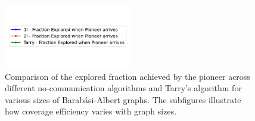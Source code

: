 \begin{figure}[H]
    \centering
    \qquad
    \qquad
    \includegraphics[width=0.5\textwidth]{Cap3/no_comm_fraction_legend.pdf}
    \newline
    \qquad
    \newline
    \qquad
    \caption{Comparison of the explored fraction achieved by the pioneer across different no-communication algorithms and Tarry's algorithm for various sizes of Barabási-Albert graphs. The subfigures illustrate how coverage efficiency varies with graph sizes.}
    \label{fig_no_comm_fraction_all_sizes_barabasi}
\end{figure}

